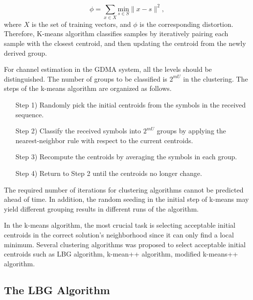 \begin{equation}
 \phi = \sum_{x \in X} \underset{s \in S}{\text{min}} \parallel x-s \parallel^2,
\end{equation}
where $X$ is the set of training vectors, and $\phi$ is the corresponding distortion. Therefore, K-means algorithm classifies samples by iteratively pairing each sample with the closest centroid, and then updating the centroid from the newly derived group.

For channel estimation in the GDMA system, all the levels should be distinguished. The number of groups to be classified is $2^{mU}$ in the clustering. The steps of the k-means algorithm are organized as follows.
\begin{enumerate}[leftmargin=\leftmargin+\widthof{Prefix}]
\item[Step 1)] Randomly pick the initial centroids from the symbols in the received sequence.
\item[Step 2)] Classify the received symbols into $2^{mU}$ groups by applying the nearest-neighbor rule with respect to the current centroids.
\item[Step 3)] Recompute the centroids by averaging the symbols in each group.
\item[Step 4)] Return to Step 2 until the centroids no longer change.
\end{enumerate}
The required number of iterations for clustering algorithms cannot be predicted ahead of time. In addition, the random seeding in the initial step of k-means may yield different grouping results in different runs of the algorithm.

In the k-means algorithm, the most crucial task is selecting acceptable initial centroids in the correct solution's neighborhood since it can only find a local minimum. Several clustering algorithms was proposed to select acceptable initial centroids such as LBG algorithm, k-mean++ algorithm, modified k-means++ algorithm.


\subsection{The LBG Algorithm}

